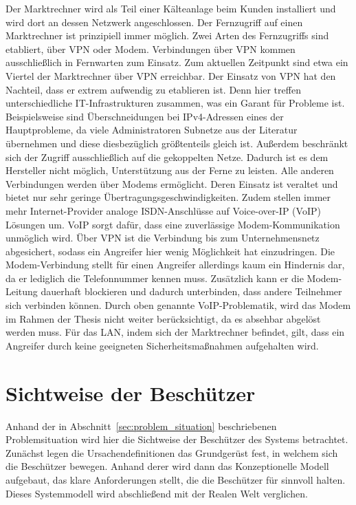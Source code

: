 \documentclass[11pt,a4paper]{report}
\begin{document}
Der Marktrechner wird als Teil einer Kälteanlage beim Kunden installiert und wird dort an dessen Netzwerk angeschlossen. Der Fernzugriff auf einen Marktrechner ist prinzipiell immer möglich. Zwei Arten des Fernzugriffs sind etabliert, über VPN oder Modem. Verbindungen über VPN kommen ausschließlich in Fernwarten zum Einsatz. Zum aktuellen Zeitpunkt sind etwa ein Viertel der Marktrechner über VPN erreichbar. Der Einsatz von VPN hat den Nachteil, dass er extrem aufwendig zu etablieren ist. Denn hier treffen unterschiedliche IT-Infrastrukturen zusammen, was ein Garant für Probleme ist. Beispielsweise sind Überschneidungen bei IPv4-Adressen eines der Hauptprobleme, da viele Administratoren Subnetze aus der Literatur übernehmen und diese diesbezüglich größtenteils gleich ist. Außerdem beschränkt sich der Zugriff ausschließlich auf die gekoppelten Netze. Dadurch ist es dem Hersteller nicht möglich, Unterstützung aus der Ferne zu leisten. Alle anderen Verbindungen werden über Modems ermöglicht. Deren Einsatz ist veraltet und bietet nur sehr geringe Übertragungsgeschwindigkeiten. Zudem stellen immer mehr Internet-Provider analoge ISDN-Anschlüsse auf Voice-over-IP (VoIP) Lösungen um. VoIP sorgt dafür, dass eine zuverlässige Modem-Kommunikation unmöglich wird. Über VPN ist die Verbindung bis zum Unternehmensnetz abgesichert, sodass ein Angreifer hier wenig Möglichkeit hat einzudringen. Die Modem-Verbindung stellt für einen Angreifer allerdings kaum ein Hindernis dar, da er lediglich die Telefonnummer kennen muss. Zusätzlich kann er die Modem-Leitung dauerhaft blockieren und dadurch unterbinden, dass andere Teilnehmer sich verbinden können. Durch oben genannte VoIP-Problematik, wird das Modem im Rahmen der Thesis nicht weiter berücksichtigt, da es absehbar abgelöst werden muss. Für das LAN, indem sich der Marktrechner befindet, gilt, dass ein Angreifer durch keine geeigneten Sicherheitsmaßnahmen aufgehalten wird.

\section{Sichtweise der Beschützer} 

Anhand der in Abschnitt~\ref{sec:problem_situation} beschriebenen Problemsituation wird hier die Sichtweise der Beschützer des Systems betrachtet. Zunächst legen die Ursachendefinitionen das Grundgerüst fest, in welchem sich die Beschützer bewegen. Anhand derer wird dann das Konzeptionelle Modell aufgebaut, das klare Anforderungen stellt, die die Beschützer für sinnvoll halten. Dieses Systemmodell wird abschließend mit der Realen Welt verglichen.
\end{document}
